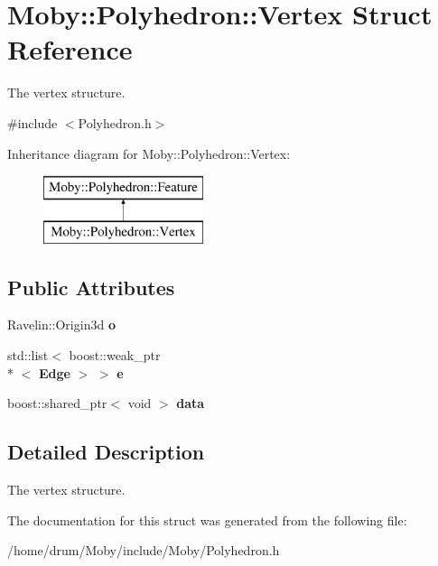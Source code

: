 \section{Moby\-:\-:Polyhedron\-:\-:Vertex Struct Reference}
\label{structMoby_1_1Polyhedron_1_1Vertex}


The vertex structure.  




{\ttfamily \#include $<$Polyhedron.\-h$>$}

Inheritance diagram for Moby\-:\-:Polyhedron\-:\-:Vertex\-:\begin{figure}[H]
\begin{center}
\leavevmode
\includegraphics[height=2.000000cm]{structMoby_1_1Polyhedron_1_1Vertex}
\end{center}
\end{figure}
\subsection*{Public Attributes}
\begin{DoxyCompactItemize}
\item 
Ravelin\-::\-Origin3d {\bfseries o}\label{structMoby_1_1Polyhedron_1_1Vertex_a0c8ff3cb11c6581649c53c92d5f11bd6}

\item 
std\-::list$<$ boost\-::weak\-\_\-ptr\\*
$<$ {\bf Edge} $>$ $>$ {\bfseries e}\label{structMoby_1_1Polyhedron_1_1Vertex_a057d281aa2cfa7be9fe9c432cc0742dc}

\item 
boost\-::shared\-\_\-ptr$<$ void $>$ {\bfseries data}\label{structMoby_1_1Polyhedron_1_1Vertex_acb511ca529bfe8a9f5270f18ae0aa7c5}

\end{DoxyCompactItemize}


\subsection{Detailed Description}
The vertex structure. 

The documentation for this struct was generated from the following file\-:\begin{DoxyCompactItemize}
\item 
/home/drum/\-Moby/include/\-Moby/Polyhedron.\-h\end{DoxyCompactItemize}
